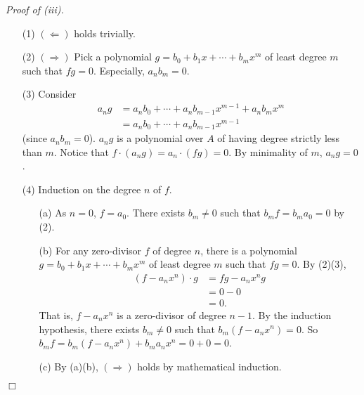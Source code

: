 \documentclass{article}
\begin{document}
\emph{Proof of (iii).}
\begin{enumerate}
\item[(1)]
  $(\Longleftarrow)$ holds trivially.

\item[(2)]
  $(\Longrightarrow)$
  Pick a polynomial $g = b_0 + b_1 x + \cdots + b_m x^m$
  of least degree $m$ such that $fg = 0$.
  Especially, $a_n b_m = 0$.

\item[(3)]
  Consider
  \begin{align*}
    a_n g
    &= a_n b_0 + \cdots + a_n b_{m-1} x^{m-1} + a_n b_m x^m \\
    &= a_n b_0 + \cdots + a_n b_{m-1} x^{m-1}
  \end{align*}
  (since $a_n b_m = 0$).
  $a_n g$ is a polynomial over $A$ of having degree strictly less than $m$.
  Notice that $f \cdot (a_n g) = a_n \cdot (fg)= 0$.
  By minimality of $m$, $a_n g = 0$.

\item[(4)]
  Induction on the degree $n$ of $f$.
  \begin{enumerate}
  \item[(a)]
    As $n = 0$, $f = a_0$. There exists $b_m \neq 0$ such that $b_m f = b_m a_0 = 0$ by (2).

  \item[(b)]
    For any zero-divisor $f$ of degree $n$,
    there is a polynomial $g = b_0 + b_1 x + \cdots + b_m x^m$
    of least degree $m$ such that $fg = 0$. By (2)(3),
    \begin{align*}
      (f - a_n x^n) \cdot g
      &= fg - a_n x^n g \\
      &= 0 - 0 \\
      &= 0.
    \end{align*}
    That is, $f - a_n x^n$ is a zero-divisor of degree $n-1$.
    By the induction hypothesis,
    there exists $b_m \neq 0$ such that $b_{m}(f - a_n x^n) = 0$.
    So $b_m f = b_{m}(f - a_n x^n) + b_m a_n x^n = 0 + 0 = 0$.

    \item[(c)]
      By (a)(b), $(\Longrightarrow)$ holds by mathematical induction.
  \end{enumerate}
\end{enumerate}
$\Box$ \\
\end{document}
